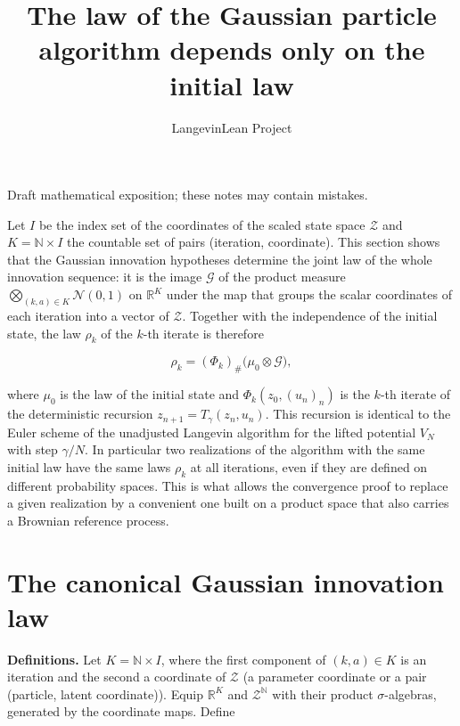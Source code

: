 \documentclass[11pt,a4paper]{article}
\title{\texorpdfstring{The law of the Gaussian particle algorithm depends only on the initial law}{The law of the Gaussian particle algorithm depends only on the initial law}}
\author{LangevinLean Project}
\date{}
\begin{document}
\maketitle
Draft mathematical exposition; these notes may contain mistakes.


Let \(I\) be the index set of the coordinates of the scaled state space \(\mathcal Z\) and \(K=\mathbb N\times I\) the countable set of pairs (iteration, coordinate). This section shows that the Gaussian innovation hypotheses determine the joint law of the whole innovation sequence: it is the image \(\mathcal G\) of the product measure \(\bigotimes_{(k,a)\in K}\mathcal N(0,1)\) on \(\mathbb R^K\) under the map that groups the scalar coordinates of each iteration into a vector of \(\mathcal Z\). Together with the independence of the initial state, the law \(\rho_k\) of the \(k\)-th iterate is therefore


\[\rho_k=(\Phi_k)_\#\bigl(\mu_0\otimes\mathcal G\bigr),\]


where \(\mu_0\) is the law of the initial state and \(\Phi_k(z_0,(u_n)_n)\) is the \(k\)-th iterate of the deterministic recursion \(z_{n+1}=T_\gamma(z_n,u_n)\). This recursion is identical to the Euler scheme of the unadjusted Langevin algorithm for the lifted potential \(V_N\) with step \(\gamma/N\). In particular two realizations of the algorithm with the same initial law have the same laws \(\rho_k\) at all iterations, even if they are defined on different probability spaces. This is what allows the convergence proof to replace a given realization by a convenient one built on a product space that also carries a Brownian reference process.


\section{\texorpdfstring{The canonical Gaussian innovation law}{The canonical Gaussian innovation law}}


\textbf{Definitions.} Let \(K=\mathbb N\times I\), where the first component of \((k,a)\in K\) is an iteration and the second a coordinate of \(\mathcal Z\) (a parameter coordinate or a pair (particle, latent coordinate)). Equip \(\mathbb R^K\) and \(\mathcal Z^{\mathbb N}\) with their product \(\sigma\)-algebras, generated by the coordinate maps. Define
\end{document}
